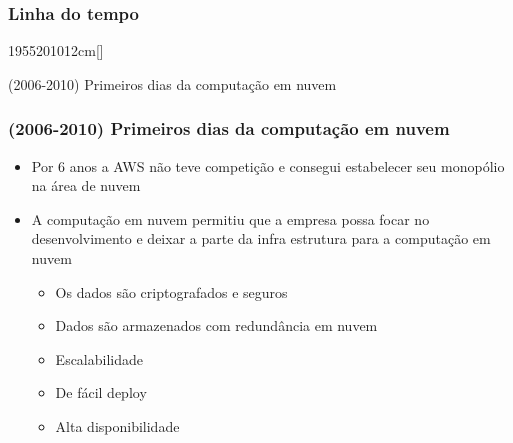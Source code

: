 \begin{frame}
	\frametitle{Linha do tempo}
	\begin{scriptsize}
	\begin{bf}
	\begin{center}
		\begin{chronology}[10]{1955}{2010}{12cm}[\textwidth]
			\color{lightgreen}
		\end{chronology}
	\end{center}
	\end{bf}
	\end{scriptsize}
	\begin{center}
		(2006-2010) Primeiros dias da computação em nuvem
	\end{center}
\end{frame}

\begin{frame}
	\frametitle{(2006-2010) Primeiros dias da computação em nuvem}
	\begin{itemize}
		\item Por 6 anos a AWS não teve competição e consegui estabelecer seu monopólio na área de nuvem
		\item A computação em nuvem permitiu que a empresa possa focar no desenvolvimento e deixar a parte da infra estrutura para a computação em nuvem
			\begin{itemize}
				\item Os dados são criptografados e seguros
				\item Dados são armazenados com redundância em nuvem
				\item Escalabilidade
				\item De fácil deploy
				\item Alta disponibilidade
			\end{itemize}
	\end{itemize}
\end{frame}

